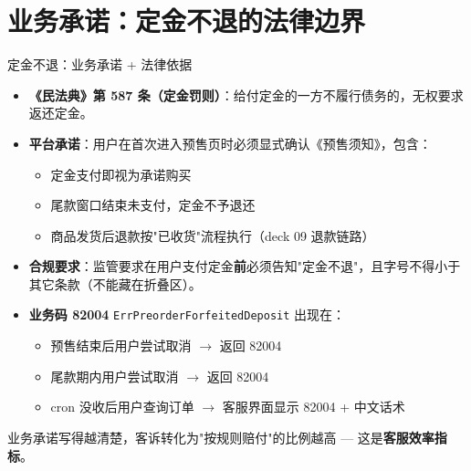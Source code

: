 \documentclass[aspectratio=169,11pt]{beamer}
\begin{document}
\section{业务承诺：定金不退的法律边界}

\begin{frame}[shrink]{定金不退：业务承诺 + 法律依据}
\begin{itemize}\small
  \item \textbf{《民法典》第 587 条（定金罚则）}：给付定金的一方不履行债务的，无权要求返还定金。
  \item \textbf{平台承诺}：用户在首次进入预售页时必须显式确认《预售须知》，包含：
    \begin{itemize}\footnotesize
      \item 定金支付即视为承诺购买
      \item 尾款窗口结束未支付，定金不予退还
      \item 商品发货后退款按"已收货"流程执行（deck 09 退款链路）
    \end{itemize}
  \item \textbf{合规要求}：监管要求在用户支付定金\textbf{前}必须告知"定金不退"，且字号不得小于其它条款（不能藏在折叠区）。
  \item \textbf{业务码 82004} \texttt{ErrPreorderForfeitedDeposit} 出现在：
    \begin{itemize}\footnotesize
      \item 预售结束后用户尝试取消 $\to$ 返回 82004
      \item 尾款期内用户尝试取消 $\to$ 返回 82004
      \item cron 没收后用户查询订单 $\to$ 客服界面显示 82004 + 中文话术
    \end{itemize}
\end{itemize}
\begin{center}
\begin{tcolorbox}[colback=cMute,colframe=cMain,boxrule=0.5pt,arc=2pt,width=0.92\textwidth]
业务承诺写得越清楚，客诉转化为"按规则赔付"的比例越高 — 这是\textbf{客服效率指标}。
\end{tcolorbox}
\end{center}
\vspace{1mm}
\end{frame}
\end{document}
